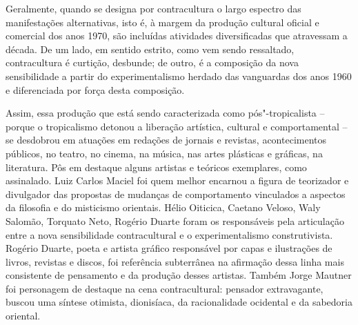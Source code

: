 \asterisc

Geralmente, quando se designa por contracultura o largo espectro das
manifestações alternativas, isto é, à margem da produção cultural
oficial e comercial dos anos 1970, são incluídas atividades
diversificadas que atravessam a década. De um lado, em sentido estrito,
como vem sendo ressaltado, contracultura é curtição, desbunde; de outro,
é a composição da nova sensibilidade a partir do experimentalismo
herdado das vanguardas dos anos 1960 e diferenciada por força desta
composição.

Assim, essa produção que está sendo caracterizada como pós"-tropicalista
-- porque o tropicalismo detonou a liberação artística, cultural e
comportamental -- se desdobrou em atuações em redações de jornais e
revistas, acontecimentos públicos, no teatro, no cinema, na música, nas
artes plásticas e gráficas, na literatura. Pôs em destaque alguns
artistas e teóricos exemplares, como assinalado. Luiz Carlos Maciel foi
quem melhor encarnou a figura de teorizador e divulgador das propostas
de mudanças de comportamento vinculados a aspectos da filosofia e do
misticismo orientais. Hélio Oiticica, Caetano Veloso, Waly Salomão,
Torquato Neto, Rogério Duarte foram os responsáveis pela articulação
entre a nova sensibilidade contracultural e o experimentalismo
construtivista. Rogério Duarte, poeta e artista gráfico responsável por
capas e ilustrações de livros, revistas e discos, foi referência
subterrânea na afirmação dessa linha mais consistente de pensamento e da
produção desses artistas. Também Jorge Mautner foi personagem de
destaque na cena contracultural: pensador extravagante, buscou uma
síntese otimista, dionisíaca, da racionalidade ocidental e da sabedoria
oriental.

